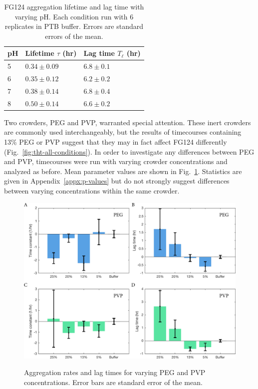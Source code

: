 \begin{table}[b!]
\centering
  \caption[Aggregation lifetimes and lag times with varying pH.]{FG124 aggregation lifetime and lag time with varying pH. Each condition run with 6 replicates in PTB buffer.  Errors are standard errors of the mean.}
    \label{table:FG124-pH}
    \begin{tabular}{p{1cm}p{3cm}p{3cm}}
      pH & Lifetime $\tau$ (hr) & Lag time $T_\ell$ (hr) \\
      \hline
      5 & $0.34 \pm 0.09$ & $6.8 \pm 0.1$ \\
      6 & $0.35 \pm 0.12$ & $6.2 \pm 0.2$ \\
      7 & $0.38 \pm 0.14$ & $6.8 \pm 0.4$ \\
      8 & $0.50 \pm 0.14$ & $6.6 \pm 0.2$ \\
    \end{tabular}
\end{table}

Two crowders, PEG and PVP, warranted special attention.  These inert crowders are commonly used interchangeably, but the results of timecourses containing 13\% PEG or PVP suggest that they may in fact affect FG124 differently (Fig.~\ref{fig:tht-all-conditions}).  In order to investigate any differences between PEG and PVP, timecourses were run with varying crowder concentrations and analyzed as before.  Mean parameter values are shown in Fig.~\ref{fig:peg-pvp}.  Statistics are given in Appendix~\ref{appx:p-values} but do not strongly suggest differences between varying concentrations within the same crowder.

\begin{figure}
\caption[Aggregation rates and lag times for varying PEG and PVP concentrations.]{Aggregation rates and lag times for varying PEG and PVP concentrations. Error bars are standard error of the mean.}
\centering
\includegraphics[width=\textwidth]{figs/ch05/peg-and-pvp-charts.pdf}
\label{fig:peg-pvp}
\end{figure}

